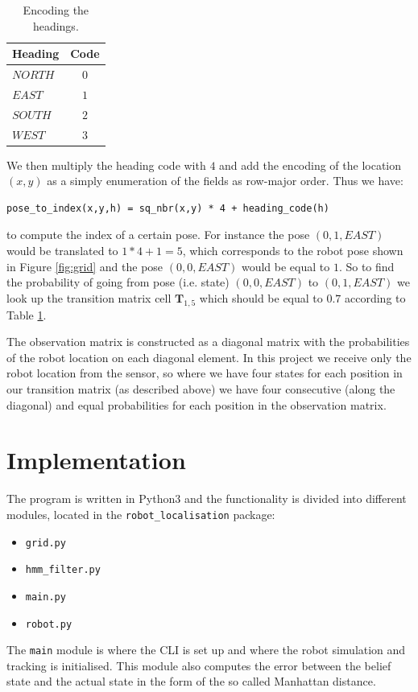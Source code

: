 \documentclass{article}
\begin{document}
\begin{table}[ht]
\centering
  \begin{tabular}{ | l | c | }
    \hline
    \textbf{Heading}    & \textbf{Code}   \\ \hline
    $NORTH$             & $0$             \\ \hline
    $EAST$              & $1$             \\ \hline
    $SOUTH$             & $2$             \\ \hline
    $WEST$              & $3$             \\ \hline
  \end{tabular}
  \caption{Encoding the headings.}
  \label{tab:headings}
\end{table}
We then multiply the heading code with $4$ and add the encoding of the location $(x,y)$ as a simply enumeration of the fields as row-major order. Thus we have:
\begin{lstlisting}
pose_to_index(x,y,h) = sq_nbr(x,y) * 4 + heading_code(h)
\end{lstlisting} to compute the index of a certain pose. For instance the pose $(0,1,EAST)$ would be translated to $1*4 + 1 = 5$, which corresponds to the robot pose shown in Figure \ref{fig:grid} and the pose $(0,0,EAST)$ would be equal to $1$. So to find the probability of going from pose (i.e. state) $(0,0,EAST)$ to $(0,1,EAST)$ we look up the transition matrix cell $\textbf{T}_{1, 5}$ which should be equal to $0.7$ according to Table \ref{tab:headings}.

The observation matrix is constructed as a diagonal matrix with the probabilities of the robot location on each diagonal element. In this project we receive only the robot location from the sensor, so where we have four states for each position in our transition matrix (as described above) we have four consecutive (along the diagonal) and equal probabilities for each position in the observation matrix.


\section{Implementation}
The program is written in Python3 and the functionality is divided into different modules, located in the \texttt{robot\_localisation} package:
\begin{itemize}
    \item \texttt{grid.py}
    \item \texttt{hmm\_filter.py}
    \item \texttt{main.py}
    \item \texttt{robot.py}
\end{itemize}
The \texttt{main} module is where the CLI is set up and where the robot simulation and tracking is initialised. This module also computes the error between the belief state and the actual state in the form of the so called Manhattan distance.
\end{document}

